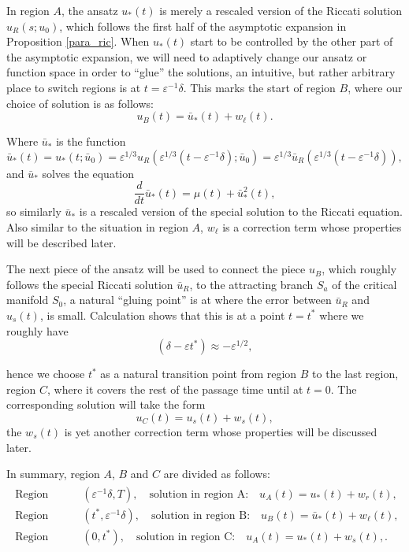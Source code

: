 \documentclass[letterpaper,11pt]{article}
\newcommand{\eps}{\varepsilon}
\numberwithin{equation}{section}
\theoremstyle{plain}
\begin{document}
In region $A$, the ansatz $u_*(t)$ is merely a rescaled version of the Riccati solution $u_R(s; u_0)$, which follows the first half of the asymptotic expansion in Proposition \ref{para_ric}. When $u_*(t)$ start to be controlled by the other part of the asymptotic expansion, we will need to adaptively change our ansatz or function space in order to ``glue'' the solutions, an intuitive, but rather arbitrary place to switch regions is at $t = \eps^{-1} \delta$. This marks the start of region $B$, where our choice of solution is as follows:
 \[ 
 u_B(t) = \bar{u}_*(t)  +w_\ell(t).
\]

Where $\bar{u}_*$ is the function
\begin{equation}\label{uldef}
\bar{u}_*(t) = u_*(t;\bar{u}_0) = \eps^{1/3} u_R( \eps^{1/3}(t-\eps^{-1}\delta); \bar{u}_0)=\eps^{1/3}\bar{u}_R(\eps^{1/3}(t-\eps^{-1}\delta)),
\end{equation}
and $\bar{u}_*$ solves the equation
\begin{equation}\label{uleq}
\frac{d}{dt}\bar{u}_* (t) = \mu(t) + \bar{u}_*^2(t),
\end{equation}
so similarly $\bar{u}_*$ is a rescaled version of the special solution to the Riccati equation. Also similar to the situation in region $A$, $w_\ell$ is a correction term whose properties will be described later.

The next piece of the ansatz will be used to connect the piece $u_B$, which roughly follows the special Riccati solution $\bar{u}_R$, to the attracting branch $S_a$ of the critical manifold $S_0$, a natural ``gluing point'' is at where the error between $\bar{u}_R$ and $u_s(t)$, is small. Calculation shows that this is at a point $t=t^*$ where we roughly have
\begin{equation}
(\delta - \eps t^*) \approx -\eps^{1/2},
\end{equation} 

hence we choose $t^*$ as a natural transition point from region $B$ to the last region, region $C$, where it covers the rest of the passage time until at $t=0$. The corresponding solution will take the form
\[
u_C(t) = u_s(t) + w_s(t),
\]
the $w_s(t)$ is yet another correction term whose properties will be discussed later. 

In summary, region $A$, $B$ and $C$ are divided as follows:
\begin{align}\label{region_division_t}
\begin{split}
\text{Region A:} & \quad (\eps^{-1}\delta, T), \quad \text{solution in region A:} \quad u_A(t) = u_*(t)+w_r(t), \\
\text{Region B:} & \quad (t^*, \eps^{-1}\delta), \quad \text{solution in region B:} \quad u_B(t) = \bar{u}_*(t)+w_\ell(t),  \\
\text{Region C:} & \quad (0, t^*), \quad \text{solution in region C:} \quad u_A(t) = u_*(t)+w_s(t), .
\end{split}
\end{align}
\end{document}
